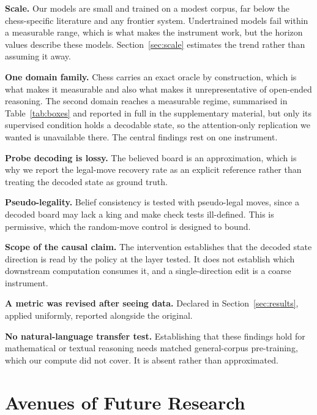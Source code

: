 \documentclass[manuscript, screen, review]{jair}
\theoremstyle{remark}
\begin{document}
\begin{description}[nosep]
\item[L1] \textbf{Scale.} Our models are small and trained on a modest corpus,
far below the chess-specific literature and any frontier system. Undertrained
models fail within a measurable range, which is what makes the instrument work,
but the horizon values describe these models. Section~\ref{sec:scale} estimates
the trend rather than assuming it away.
\item[L2] \textbf{One domain family.} Chess carries an exact oracle by
construction, which is what makes it measurable and also what makes it
unrepresentative of open-ended reasoning. The second domain reaches a measurable regime,
summarised in Table~\ref{tab:boxes} and reported in full in the supplementary
material, but only its supervised condition holds a decodable state, so the
attention-only replication we wanted is unavailable there. The central findings
rest on one instrument.


\item[L3] \textbf{Probe decoding is lossy.} The believed board is an
approximation, which is why we report the legal-move recovery rate as an explicit
reference rather than treating the decoded state as ground truth.
\item[L4] \textbf{Pseudo-legality.} Belief consistency is tested with
pseudo-legal moves, since a decoded board may lack a king and make check tests
ill-defined. This is permissive, which the random-move control is designed to
bound.
\item[L5] \textbf{Scope of the causal claim.} The intervention establishes that
the decoded state direction is read by the policy at the layer tested. It does
not establish which downstream computation consumes it, and a single-direction
edit is a coarse instrument.
\item[L6] \textbf{A metric was revised after seeing data.} Declared in
Section~\ref{sec:results}, applied uniformly, reported alongside the original.
\item[L7] \textbf{No natural-language transfer test.} Establishing that these
findings hold for mathematical or textual reasoning needs matched general-corpus
pre-training, which our compute did not cover. It is absent rather than
approximated.
\end{description}

\section{Avenues of Future Research}
\end{document}
